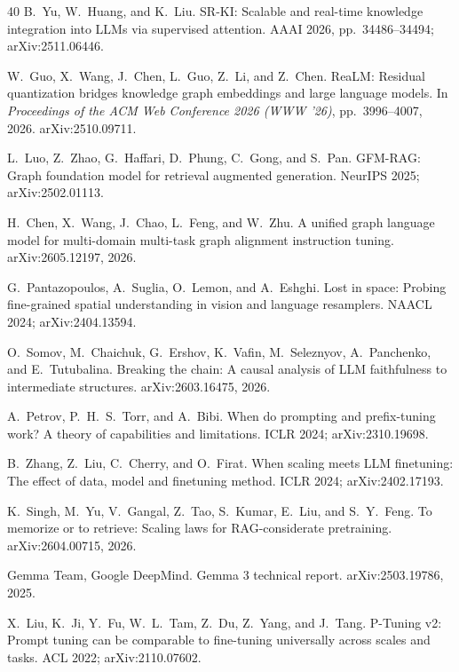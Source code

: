 \documentclass{article}
\begin{document}
\begin{thebibliography}{40}
 B.~Yu, W.~Huang, and K.~Liu.
\newblock SR-KI: Scalable and real-time knowledge integration into LLMs via supervised
  attention.
\newblock AAAI 2026, pp.~34486--34494; arXiv:2511.06446.

 W.~Guo, X.~Wang, J.~Chen, L.~Guo, Z.~Li, and Z.~Chen.
\newblock ReaLM: Residual quantization bridges knowledge graph embeddings and large language
  models.
\newblock In \emph{Proceedings of the ACM Web Conference 2026 (WWW '26)}, pp.~3996--4007,
  2026. arXiv:2510.09711.

 L.~Luo, Z.~Zhao, G.~Haffari, D.~Phung, C.~Gong, and S.~Pan.
\newblock GFM-RAG: Graph foundation model for retrieval augmented generation.
\newblock NeurIPS 2025; arXiv:2502.01113.

 H.~Chen, X.~Wang, J.~Chao, L.~Feng, and W.~Zhu.
\newblock A unified graph language model for multi-domain multi-task graph alignment
  instruction tuning.
\newblock arXiv:2605.12197, 2026.

 G.~Pantazopoulos, A.~Suglia, O.~Lemon, and A.~Eshghi.
\newblock Lost in space: Probing fine-grained spatial understanding in vision and language
  resamplers.
\newblock NAACL 2024; arXiv:2404.13594.

 O.~Somov, M.~Chaichuk, G.~Ershov, K.~Vafin, M.~Seleznyov,
  A.~Panchenko, and E.~Tutubalina.
\newblock Breaking the chain: A causal analysis of LLM faithfulness to intermediate
  structures.
\newblock arXiv:2603.16475, 2026.

 A.~Petrov, P.~H.~S.~Torr, and A.~Bibi.
\newblock When do prompting and prefix-tuning work? A theory of capabilities and limitations.
\newblock ICLR 2024; arXiv:2310.19698.

 B.~Zhang, Z.~Liu, C.~Cherry, and O.~Firat.
\newblock When scaling meets LLM finetuning: The effect of data, model and finetuning method.
\newblock ICLR 2024; arXiv:2402.17193.

 K.~Singh, M.~Yu, V.~Gangal, Z.~Tao, S.~Kumar, E.~Liu, and
  S.~Y.~Feng.
\newblock To memorize or to retrieve: Scaling laws for RAG-considerate pretraining.
\newblock arXiv:2604.00715, 2026.

 Gemma Team, Google DeepMind.
\newblock Gemma 3 technical report.
\newblock arXiv:2503.19786, 2025.

 X.~Liu, K.~Ji, Y.~Fu, W.~L.~Tam, Z.~Du, Z.~Yang, and J.~Tang.
\newblock P-Tuning v2: Prompt tuning can be comparable to fine-tuning universally across
  scales and tasks.
\newblock ACL 2022; arXiv:2110.07602.


\end{thebibliography}
\end{document}
